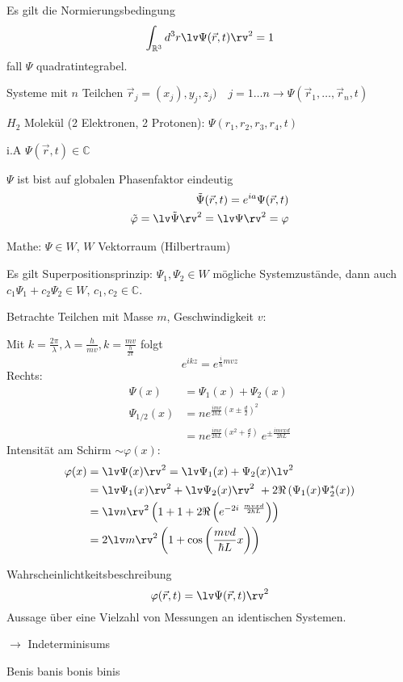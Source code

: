 Es gilt die Normierungsbedingung
\begin{equation*}
    \int_{\mathbb{R}^3} d^3 r \lv \Psi(\vec{r},t)\rv^2=1
\end{equation*}
fall $\Psi$ quadratintegrabel.
\begin{bem}
    \item 
    Systeme mit $n$ Teilchen $\vec{r}_j = (x_j),y_j,z_j) \quad j=1 \ldots
    n \rightarrow \Psi(\vec{r}_1, \ldots, \vec{r}_n,t)$

    $H_2$ Molekül (2 Elektronen, 2 Protonen): $\Psi(r_1,r_2,r_3,r_4,t)$ 
    \item
    i.A $\Psi(\vec{r},t) \in \mathbb{C}$
    \item
    $\Psi$ ist bist auf globalen Phasenfaktor eindeutig 
    \begin{align*}
        \tilde{\Psi}(\vec{r},t)=
        e^{ia} \Psi(\vec{r},t) \\
        \tilde{\varphi}=\lv \tilde{\Psi} \rv^2 = \lv \Psi \rv^2 = \varphi
    \end{align*}
    \item Mathe: $\Psi \in W$, $W$ Vektorraum (Hilbertraum)

    Es gilt Superpositionsprinzip: $\Psi_1, \Psi_2 \in W$ mögliche
    Systemzustände, dann auch $c_1 \Psi_1 + c_2 \Psi_2 \in W$, $c_1,c_2 \in
    \mathbb{C}$. 

    Betrachte Teilchen mit Masse $m$, Geschwindigkeit $v$:

    Mit
    $k=\frac{2\pi}{\lambda},\lambda=\frac{h}{mv},k=\frac{mv}{\frac{h}{2\pi}}$
    folgt
    \begin{equation*}
        e^{ikz} = e^{\frac{i}{\hbar}mvz}
    \end{equation*}
    Rechts:
    \begin{align*}
        \Psi(x) &= \Psi_1(x) + \Psi_2(x) \\
        \Psi_{1/2}(x) &= n e^{\frac{imv}{2\hbar L}\left(x \pm \frac{d}{2}\right)^2} \\
        &= n e^{\frac{imv}{2\hbar L}\left(x^2 + \frac{d}{r}\right)} \
        e^{\pm \frac{imvxd}{2\hbar L}}
    \end{align*}
    Intensität am Schirm $\sim \varphi(x)$:
    \begin{align*}
       \varphi(x) &= \lv \Psi(x) \rv^2 = \lv \Psi_1(x) + \Psi_2(x)\lv^2 \\
                &= \lv \Psi_1(x) \rv^2 + \lv \Psi_2(x) \rv^2 \
                    + 2\Re \left( \Psi_1(x) \Psi_2^*(x) \right) \\
                &= \lv n \rv^2  \left( 1 + 1 + 2\Re \left( e^{-2i \
                    \frac{mvxd}{2\hbar L}}\right) \right)\\
                &= 2 \lv m \rv^2 \left( 1 + \cos \left(\frac{mvd}{\hbar L}x \right) \right)
    \end{align*}
    \item \qme Wahrscheinlichtkeitsbeschreibung
    \begin{equation*}
        \varphi(\vec{r},t) = \lv \Psi(\vec{r},t)\rv^2
    \end{equation*}
    Aussage über eine Vielzahl von Messungen an identischen Systemen.

    $\longrightarrow$ Indeterminisums
\end{bem}
Benis
banis
bonis
binis
